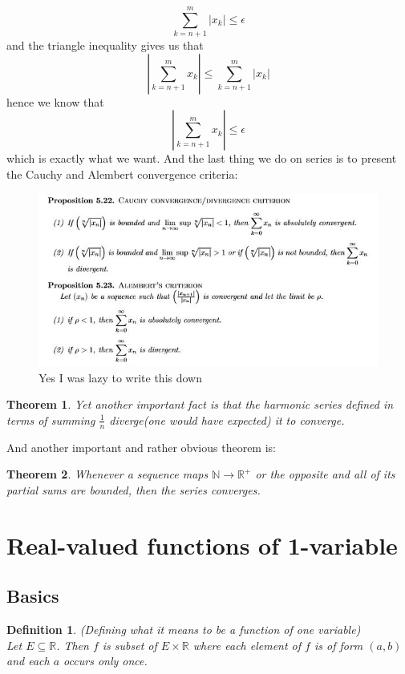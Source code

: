 \documentclass[titlepage]{article}
\newtheorem{theorem}{Theorem}[section]
\newtheorem{definition}{Definition}
\numberwithin{equation}{subsection}
\begin{document}
$$ \sum_{k=n+1}^{m} |x_{k}| \leq \epsilon$$ and the triangle inequality gives us that $$ |\sum_{k=n+1}^{m} x_{k}| \leq \sum_{k=n+1}^{m} |x_{k}| $$ hence we know that $$  |\sum_{k=n+1}^{m} x_{k}| \leq \epsilon$$ which is exactly what we want. 
And the last thing we do on series is to present the Cauchy and Alembert convergence criteria:

\begin{figure}[H]
    \centering
    \includegraphics{epflLectureNotes/analysis/figures/series.JPG}
    \caption{Yes I was lazy to write this down}
    \label{fig:my_label}
\end{figure}

\begin{theorem}
Yet another important fact is that the harmonic series defined in terms of summing $\frac{1}{n}$ diverge(one would have expected) it to converge.
\end{theorem}

And another important and rather obvious theorem is:

\begin{theorem}
Whenever a sequence maps $\mathbb{N} \to \mathbb{R^{+}}$ or the opposite and all of its partial sums are bounded, then the series converges.
\end{theorem}

\section{Real-valued functions of 1-variable}
\subsection{Basics}
\begin{definition}(Defining what it means to be  a function of one variable)
\\
Let $E\subseteq\mathbb{R}$. Then $f$ is subset of $E\times\mathbb{R}$ where each element of $f$ is of form $(a,b)$ and each $a$ occurs only once. 
\end{definition}
\\
\end{document}

